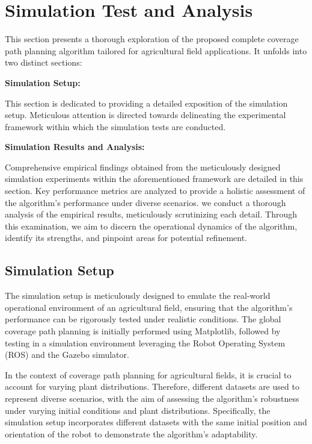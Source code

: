 
\section{Simulation Test and Analysis}


This section presents a thorough exploration of the proposed complete coverage path planning algorithm tailored for agricultural field applications. It unfolds into two distinct sections:

\vspace*{6mm}  

\textbf{Simulation Setup:} 

This section is dedicated to providing a detailed exposition of the simulation setup. Meticulous attention is directed towards delineating the experimental framework within which the simulation tests are conducted.

\vspace*{6mm}  

\textbf{Simulation Results and Analysis:}  

Comprehensive empirical findings obtained from the meticulously designed simulation experiments within the aforementioned framework are detailed in this section. Key performance metrics are analyzed to provide a holistic assessment of the algorithm's performance under diverse scenarios. we conduct a thorough analysis of the empirical results, meticulously scrutinizing each detail. Through this examination, we aim to discern the operational dynamics of the algorithm, identify its strengths, and pinpoint areas for potential refinement.
\vspace*{6mm}   

\subsection{Simulation Setup}


The simulation setup is meticulously designed to emulate the real-world operational environment of an agricultural field, ensuring that the algorithm's performance can be rigorously tested under realistic conditions. The global coverage path planning is initially performed using Matplotlib, followed by testing in a simulation environment leveraging the Robot Operating System (ROS) and the Gazebo simulator.

\vspace*{6mm}  

In the context of coverage path planning for agricultural fields, it is crucial to account for varying plant distributions. Therefore, different datasets are used to represent diverse scenarios, with the aim of assessing the algorithm's robustness under varying initial conditions and plant distributions. Specifically, the simulation setup incorporates different datasets with the same initial position and orientation of the robot to demonstrate the algorithm's adaptability.

